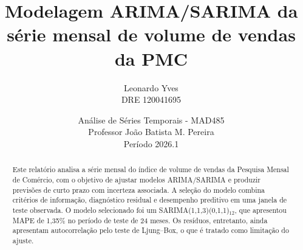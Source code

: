 ﻿\documentclass[11pt,a4paper]{article}
\title{Modelagem ARIMA/SARIMA da série mensal de volume de vendas da PMC}
\author{Leonardo Yves \\ DRE 120041695}
\date{Análise de Séries Temporais - MAD485 \\ Professor João Batista M. Pereira \\ Período 2026.1}
\begin{document}
\maketitle

\begin{abstract}
Este relatório analisa a série mensal do índice de volume de vendas da Pesquisa Mensal de Comércio, com o objetivo de ajustar modelos ARIMA/SARIMA e produzir previsões de curto prazo com incerteza associada. A seleção do modelo combina critérios de informação, diagnóstico residual e desempenho preditivo em uma janela de teste observada. O modelo selecionado foi um SARIMA(1,1,3)(0,1,1)$_{12}$, que apresentou MAPE de 1,35\% no período de teste de 24 meses. Os resíduos, entretanto, ainda apresentam autocorrelação pelo teste de Ljung--Box, o que é tratado como limitação do ajuste.
\end{abstract}









\end{document}
